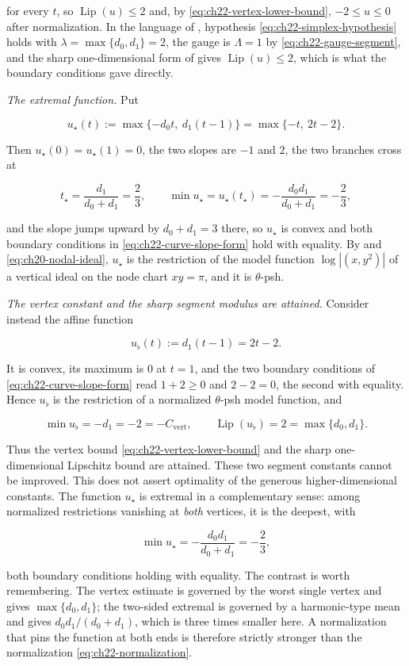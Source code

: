 \begin{example}
for every $t$, so $\operatorname{Lip}(u)\leq2$ and, by
\eqref{eq:ch22-vertex-lower-bound}, $-2\leq u\leq0$ after normalization.
In the language of , hypothesis
\eqref{eq:ch22-simplex-hypothesis} holds with
$\lambda=\max\{d_0,d_1\}=2$, the gauge is $\Lambda=1$ by
\eqref{eq:ch22-gauge-segment}, and the sharp one-dimensional form of
 gives $\operatorname{Lip}(u)\leq2$, which
is what the boundary conditions gave directly.

\emph{The extremal function.}  Put

\[
 u_\star(t):=\max\{-d_0t,\ d_1(t-1)\}=\max\{-t,\ 2t-2\}.
\tag{22.57}\label{eq:ch22-extremal-segment}
\]

Then $u_\star(0)=u_\star(1)=0$, the two slopes are $-1$ and $2$, the
two branches cross at

\[
 t_\star=\frac{d_1}{d_0+d_1}=\frac23,
 \qquad
 \min u_\star=u_\star(t_\star)=-\frac{d_0d_1}{d_0+d_1}=-\frac23 ,
\]

and the slope jumps upward by $d_0+d_1=3$ there, so $u_\star$ is convex
and both boundary conditions in \eqref{eq:ch22-curve-slope-form} hold with
equality.  By  and
\eqref{eq:ch20-nodal-ideal}, $u_\star$ is the restriction of the model
function $\log|(x,y^2)|$ of a vertical ideal on the node chart
$xy=\pi$, and it is $\theta$-psh.

\emph{The vertex constant and the sharp segment modulus are attained.}  Consider instead the affine function

\[
 u_\flat(t):=d_1(t-1)=2t-2 .
\tag{22.58}\label{eq:ch22-flat-extremal}
\]

It is convex, its maximum is $0$ at $t=1$, and the two boundary
conditions of \eqref{eq:ch22-curve-slope-form} read $1+2\geq0$ and
$2-2=0$, the second with equality.  Hence $u_\flat$ is the restriction
of a normalized $\theta$-psh model function, and

\[
 \min u_\flat=-d_1=-2=-C_{\mathrm{vert}},
 \qquad
 \operatorname{Lip}(u_\flat)=2=\max\{d_0,d_1\}.
\tag{22.59}\label{eq:ch22-segment-sharp-constants}
\]

Thus the vertex bound \eqref{eq:ch22-vertex-lower-bound} and the sharp
one-dimensional Lipschitz bound are attained.  These two segment constants
cannot be improved.  This does not assert optimality of the generous
higher-dimensional constants.  The function $u_\star$ is extremal in a
complementary sense:
among normalized restrictions vanishing at \emph{both} vertices, it is the
deepest, with

\[
 \min u_\star=-\frac{d_0d_1}{d_0+d_1}=-\frac23 ,
\]

both boundary conditions holding with equality.  The contrast is worth
remembering.  The vertex estimate is governed by the worst single vertex and
gives $\max\{d_0,d_1\}$; the two-sided extremal is governed by a
harmonic-type mean and gives $d_0d_1/(d_0+d_1)$, which is three times
smaller here.  A normalization that pins the function at both ends is
therefore strictly stronger than the normalization
\eqref{eq:ch22-normalization}.
\end{example}

